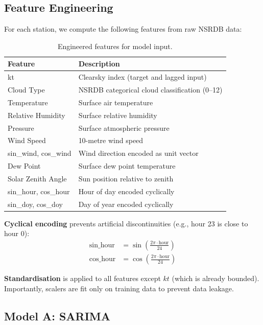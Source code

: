 \documentclass[11pt,a4paper]{article}
\begin{document}
\subsection{Feature Engineering}

For each station, we compute the following features from raw NSRDB data:

\begin{table}[H]
\centering
\caption{Engineered features for model input.}
\label{tab:features}
\begin{tabular}{ll}
\toprule
\textbf{Feature} & \textbf{Description} \\
\midrule
kt & Clearsky index (target and lagged input) \\
Cloud Type & NSRDB categorical cloud classification (0--12) \\
Temperature & Surface air temperature \\
Relative Humidity & Surface relative humidity \\
Pressure & Surface atmospheric pressure \\
Wind Speed & 10-metre wind speed \\
sin\_wind, cos\_wind & Wind direction encoded as unit vector \\
Dew Point & Surface dew point temperature \\
Solar Zenith Angle & Sun position relative to zenith \\
sin\_hour, cos\_hour & Hour of day encoded cyclically \\
sin\_doy, cos\_doy & Day of year encoded cyclically \\
\bottomrule
\end{tabular}
\end{table}

\textbf{Cyclical encoding} prevents artificial discontinuities (e.g., hour 23 is close to hour 0):
\begin{align}
    \text{sin\_hour} &= \sin\left(\frac{2\pi \cdot \text{hour}}{24}\right) \\
    \text{cos\_hour} &= \cos\left(\frac{2\pi \cdot \text{hour}}{24}\right)
\end{align}

\textbf{Standardisation} is applied to all features except $kt$ (which is already bounded). Importantly, scalers are fit only on training data to prevent data leakage.

\subsection{Model A: SARIMA}
\end{document}
